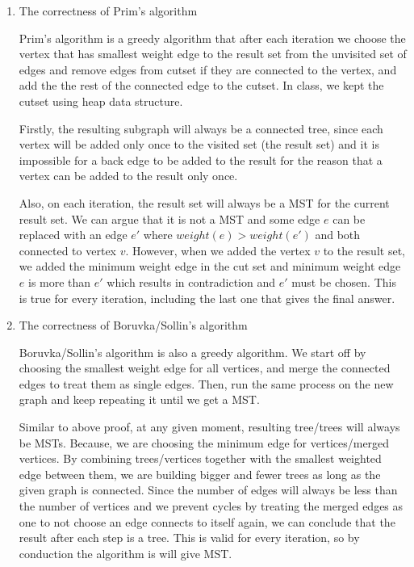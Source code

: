 \documentclass{article}
\begin{document}
\begin{enumerate}
    \item The correctness of Prim's algorithm

    Prim's algorithm is a greedy algorithm that after each iteration we choose the vertex that has smallest weight edge to the result set from the unvisited set of edges and remove edges from cutset if they are connected to the vertex, and add the the rest of the connected edge to the cutset. In class, we kept the cutset using heap data structure.

    Firstly, the resulting subgraph will always be a connected tree, since each vertex will be added only once to the visited set (the result set) and it is impossible for a back edge to be added to the result for the reason that a vertex can be added to the result only once.

    Also, on each iteration, the result set will always be a MST for the current result set. We can argue that it is not a MST and some edge $e$ can be replaced with an edge $e\prime$ where $weight(e)>weight(e\prime)$ and both connected to vertex $v$. However, when we added the vertex $v$ to the result set, we added the minimum weight edge in the cut set and minimum weight edge $e$ is more than $e\prime$ which results in contradiction and $e\prime$ must be chosen. This is true for every iteration, including the last one that gives the final answer.

    \item The correctness of Boruvka/Sollin's algorithm

    Boruvka/Sollin's algorithm is also a greedy algorithm. We start off by choosing the smallest weight edge for all vertices, and merge the connected edges to treat them as single edges. Then, run the same process on the new graph and keep repeating it until we get a MST.

    Similar to above proof, at any given moment, resulting tree/trees will always be MSTs. Because, we are choosing the minimum edge for vertices/merged vertices. By combining trees/vertices together with the smallest weighted edge between them, we are building bigger and fewer trees as long as the given graph is connected. Since the number of edges will always be less than the number of vertices and we prevent cycles by treating the merged edges as one to not choose an edge connects to itself again, we can conclude that the result after each step is a tree. This is valid for every iteration, so by conduction the algorithm is will give MST.


\end{enumerate}
\end{document}
